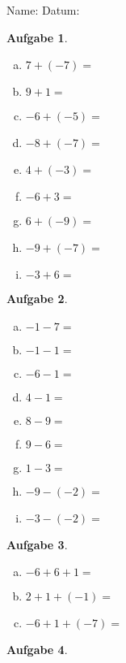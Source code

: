 \documentclass[12pt,fleqn]{article}
\theoremstyle{aufg}
\newtheorem{aufgabe}{Aufgabe}
\theoremstyle{bsp}
\begin{document}
 
    \begin{flushleft}
Name: \hspace{12cm} Datum:\begin{aufgabe} ~ \\ 
\begin{multicols}{3} 
\begin{enumerate}[a)] 
\item 
$7+(-7)=$
\item 
$9+1=$
\item 
$-6+(-5)=$
\item 
$-8+(-7)=$
\item 
$4+(-3)=$
\item 
$-6+3=$
\item 
$6+(-9)=$
\item 
$-9+(-7)=$
\item 
$-3+6=$
\end{enumerate} 
\end{multicols} 
\end{aufgabe} 
\begin{aufgabe} ~ \\ 
\begin{multicols}{3} 
\begin{enumerate}[a)] 
\item 
$-1-7=$
\item 
$-1-1=$
\item 
$-6-1=$
\item 
$4-1=$
\item 
$8-9=$
\item 
$9-6=$
\item 
$1-3=$
\item 
$-9-(-2)=$
\item 
$-3-(-2)=$
\end{enumerate} 
\end{multicols} 
\end{aufgabe} 
\begin{aufgabe} ~ \\ 
\begin{multicols}{3} 
\begin{enumerate}[a)] 
\item 
$-6+6+1=$
\item 
$2+1+(-1)=$
\item 
$-6+1+(-7)=$
\end{enumerate} 
\end{multicols} 
\end{aufgabe} 
\begin{aufgabe} ~ \\ 

\end{aufgabe}
\end{flushleft}
\end{document}
